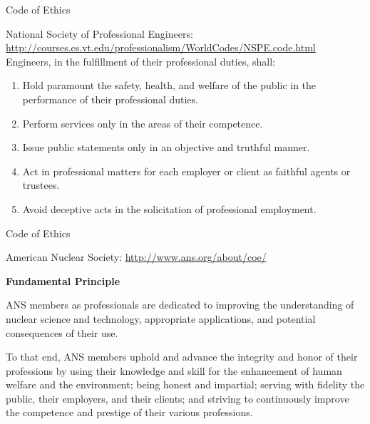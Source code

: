 \documentclass[xcolor=x11names,compress]{beamer}
\renewcommand{\(}{\begin{columns}}
\renewcommand{\)}{\end{columns}}
\newcommand{\<}[1]{\begin{column}{#1}}
\renewcommand{\>}{\end{column}}
\begin{document}
\begin{frame}{Code of Ethics}

National Society of Professional Engineers: \url{http://courses.cs.vt.edu/professionalism/WorldCodes/NSPE.code.html}\\

\vspace*{1 em}
Engineers, in the fulfillment of their professional duties, shall:

\begin{enumerate}
\item Hold paramount the safety, health, and welfare of the public in the performance of their professional duties.

\item Perform services only in the areas of their competence.

\item Issue public statements only in an objective and truthful manner.

\item Act in professional matters for each employer or client as faithful agents or trustees.

\item Avoid deceptive acts in the solicitation of professional employment.
\end{enumerate} 
 
\end{frame}


\begin{frame}{Code of Ethics}

American Nuclear Society: \url{http://www.ans.org/about/coe/}
\vspace*{1 em}

\textbf{Fundamental Principle}
\vspace*{1 em}

ANS members as professionals are dedicated to improving the understanding of nuclear science and technology, appropriate applications, and potential consequences of their use.
\vspace*{1 em}

To that end, ANS members uphold and advance the integrity and honor of their professions by using their knowledge and skill for the enhancement of human welfare and the environment; being honest and impartial; serving with fidelity the public, their employers, and their clients; and striving to continuously improve the competence and prestige of their various professions.


 
\end{frame}
\end{document}
